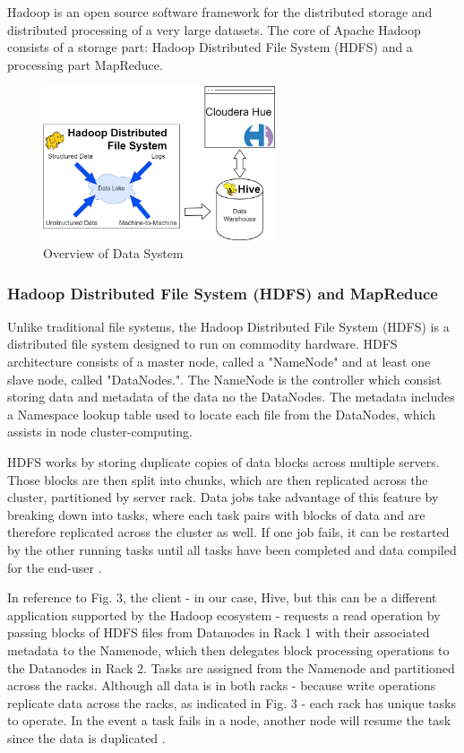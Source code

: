 \documentclass[journal]{IEEEtran}
\begin{document}
Hadoop is an open source software framework for the distributed storage and
 distributed processing of a very large datasets. 
The core of Apache Hadoop consists of a storage part: Hadoop Distributed File System
 (HDFS) and a processing part MapReduce.

\begin{figure}
	\centering
	\includegraphics[width=2.7in]{system_overview_final.png}
	\caption{Overview of Data System}
	\label{system_overview_final}
\end{figure}

\subsubsection{Hadoop Distributed File System (HDFS) and  MapReduce}

Unlike traditional file systems, the Hadoop Distributed File System (HDFS) is a distributed file system designed to run on commodity hardware. 
HDFS architecture consists of a master node, called a "NameNode" and at least one slave node, called "DataNodes."\cite{HDFSarchitecture}.
The NameNode is the controller which consist storing data and metadata of the data no the DataNodes. 
The metadata includes a Namespace lookup table used to locate each file from the DataNodes, which assists in node cluster-computing. 

HDFS works by storing duplicate copies of data blocks across multiple servers. Those blocks are then split into chunks, which are then 
replicated across the cluster, partitioned by server rack. Data jobs take advantage of this feature by breaking down into tasks, 
where each task pairs with blocks of data and are therefore replicated across the cluster as well. If one job fails, it can be restarted 
by the other running tasks until all tasks have been completed and data compiled for the end-user \cite{HadoopAdmin}.

In reference to Fig. 3, the client - in our case, Hive, but this can be a different application supported by the Hadoop ecosystem - requests a 
read operation by passing blocks of HDFS files from Datanodes in Rack 1 with their associated metadata to the Namenode, which then delegates
block processing operations to the Datanodes in Rack 2. Tasks are assigned from the Namenode and partitioned across the racks. 
Although all data is in both racks - because write operations replicate data across the racks, as indicated in Fig. 3 - each rack has unique tasks
to operate. In the event a task fails in a node, another node will resume the task since the data is duplicated \cite{HadoopAdmin}. 
\end{document}
